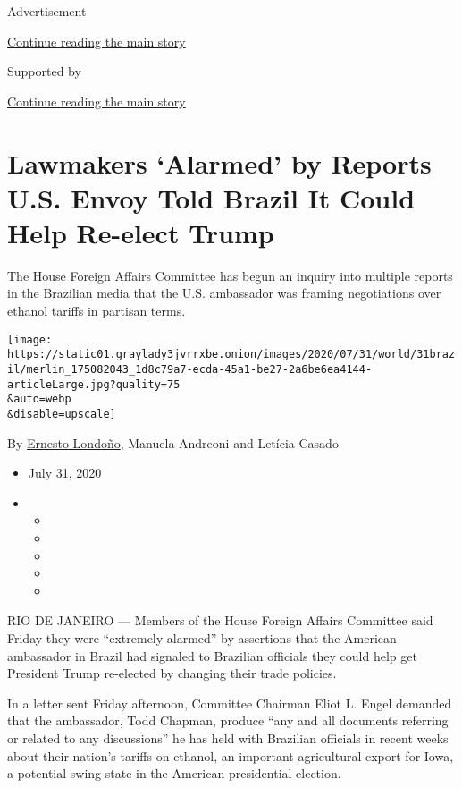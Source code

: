 Advertisement

\protect\hyperlink{after-top}{Continue reading the main story}

Supported by

\protect\hyperlink{after-sponsor}{Continue reading the main story}

\hypertarget{lawmakers-alarmed-by-reports-us-envoy-told-brazil-it-could-help-re-elect-trump}{%
\section{Lawmakers `Alarmed' by Reports U.S. Envoy Told Brazil It Could
Help Re-elect
Trump}\label{lawmakers-alarmed-by-reports-us-envoy-told-brazil-it-could-help-re-elect-trump}}

The House Foreign Affairs Committee has begun an inquiry into multiple
reports in the Brazilian media that the U.S. ambassador was framing
negotiations over ethanol tariffs in partisan terms.

\texttt{[image: https://static01.graylady3jvrrxbe.onion/images/2020/07/31/world/31brazil/merlin\_175082043\_1d8c79a7-ecda-45a1-be27-2a6be6ea4144-articleLarge.jpg?quality=75\\\&auto=webp\\\&disable=upscale]}

By \href{https://www.nytimes3xbfgragh.onion/by/ernesto-londono}{Ernesto
Londoño}, Manuela Andreoni and Letícia Casado

\begin{itemize}
\item
  July 31, 2020
\item
  \begin{itemize}
  \item
  \item
  \item
  \item
  \item
  \end{itemize}
\end{itemize}

RIO DE JANEIRO --- Members of the House Foreign Affairs Committee said
Friday they were ``extremely alarmed'' by assertions that the American
ambassador in Brazil had signaled to Brazilian officials they could help
get President Trump re-elected by changing their trade policies.

In a letter sent Friday afternoon, Committee Chairman Eliot L. Engel
demanded that the ambassador, Todd Chapman, produce ``any and all
documents referring or related to any discussions'' he has held with
Brazilian officials in recent weeks about their nation's tariffs on
ethanol, an important agricultural export for Iowa, a potential swing
state in the American presidential election.

